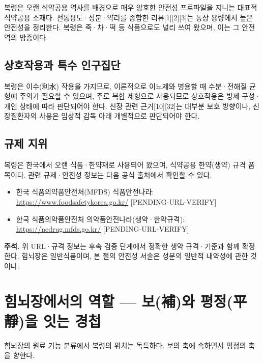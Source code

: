 \documentclass[12pt,oneside]{book}
\newenvironment{authnote}
  {\par\smallskip\begingroup\leftskip=6mm\rightskip=3mm\small\color{muted}\noindent\ignorespaces}
  {\par\endgroup\smallskip}
\begin{document}
복령은 오랜 식약공용 역사를 배경으로 매우 양호한 안전성 프로파일을 지니는 대표적 식약공용 소재다. 전통용도·성분·약리를 종합한 리뷰[1][2][3]는 통상 용량에서 높은 안전성을 정리한다. 복령은 죽·차·떡 등 식품으로도 널리 쓰여 왔으며, 이는 그 안전역의 방증이다.

\subsection{상호작용과 특수 인구집단}

복령은 이수(利水) 작용을 가지므로, 이론적으로 이뇨제와 병용할 때 수분·전해질 균형에 주의가 필요할 수 있으며, 주로 복합 제형으로 사용되므로 상호작용은 방제 구성·개인 상태에 따라 판단되어야 한다. 신장 관련 근거[10][32]는 대부분 보호 방향이나, 신장질환자의 사용은 임상적 감독 아래 개별적으로 판단되어야 한다.

\subsection{규제 지위}

복령은 한국에서 오랜 식품·한약재로 사용되어 왔으며, 식약공용 한약(생약) 규격 품목이다. 관련 규제·안전성 정보는 다음 공식 출처에서 확인할 수 있다.

\begin{itemize}[leftmargin=6mm,itemsep=1pt,topsep=2pt]
  \item 한국 식품의약품안전처(MFDS) 식품안전나라: \url{https://www.foodsafetykorea.go.kr/} [PENDING-URL-VERIFY]
  \item 한국 식품의약품안전처 의약품안전나라(생약·한약규격): \url{https://nedrug.mfds.go.kr/} [PENDING-URL-VERIFY]
\end{itemize}

\begin{authnote}\textbf{주석.} 위 URL·규격 정보는 후속 검증 단계에서 정확한 생약 규격·기준과 함께 확정한다. 힘뇌장은 일반식품이며, 본 절의 안전성 서술은 성분의 일반적 내약성에 관한 것이다.\end{authnote}

\section{힘뇌장에서의 역할 — 보(補)와 평정(平靜)을 잇는 경첩}

힘뇌장의 원료 기능 분류에서 복령의 위치는 독특하다. 보의 축에 속하면서 평정의 축을 향한다.

\vspace{2pt}\vspace{3pt}
\end{document}
